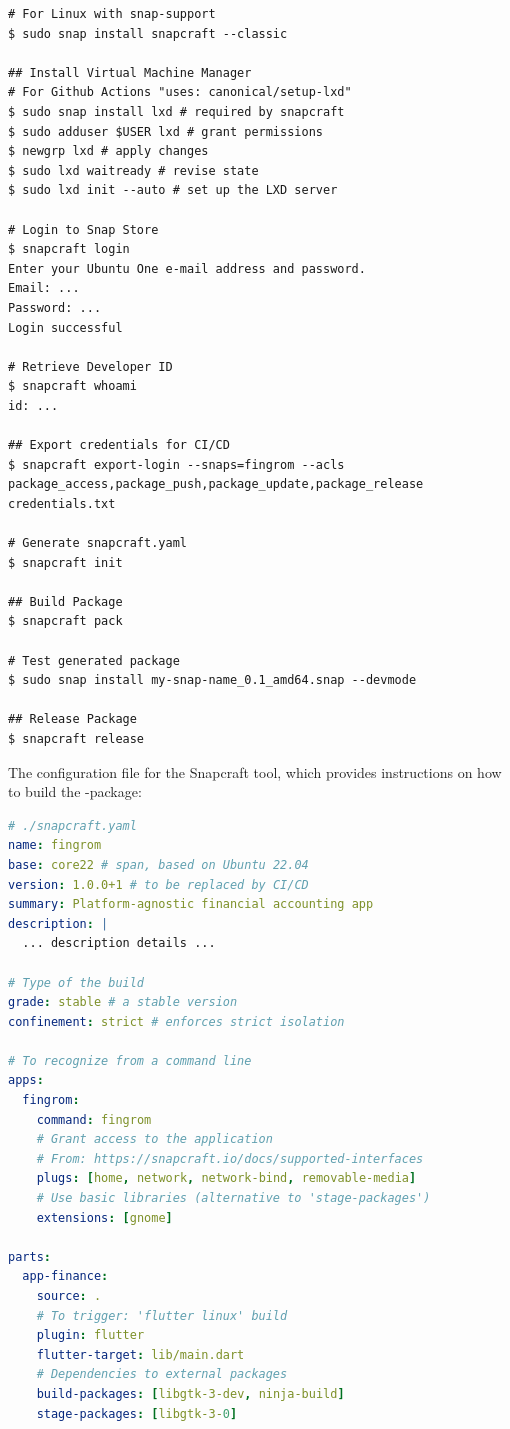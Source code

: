\begin{lstlisting}[language=terminal]
# For Linux with snap-support
$ sudo snap install snapcraft --classic

## Install Virtual Machine Manager
# For Github Actions "uses: canonical/setup-lxd"
$ sudo snap install lxd # required by snapcraft
$ sudo adduser $USER lxd # grant permissions
$ newgrp lxd # apply changes
$ sudo lxd waitready # revise state
$ sudo lxd init --auto # set up the LXD server

# Login to Snap Store
$ snapcraft login
Enter your Ubuntu One e-mail address and password.
Email: ...
Password: ...
Login successful

# Retrieve Developer ID
$ snapcraft whoami
id: ...

## Export credentials for CI/CD
$ snapcraft export-login --snaps=fingrom --acls package_access,package_push,package_update,package_release credentials.txt

# Generate snapcraft.yaml
$ snapcraft init

## Build Package
$ snapcraft pack

# Test generated package
$ sudo snap install my-snap-name_0.1_amd64.snap --devmode

## Release Package
$ snapcraft release
\end{lstlisting}

\noindent The configuration file for the Snapcraft tool, which provides instructions on how to build the -package:

\begin{lstlisting}[language=yaml]
# ./snapcraft.yaml
name: fingrom
base: core22 # span, based on Ubuntu 22.04
version: 1.0.0+1 # to be replaced by CI/CD
summary: Platform-agnostic financial accounting app
description: |
  ... description details ...

# Type of the build
grade: stable # a stable version
confinement: strict # enforces strict isolation

# To recognize from a command line
apps:
  fingrom:
    command: fingrom
    # Grant access to the application
    # From: https://snapcraft.io/docs/supported-interfaces
    plugs: [home, network, network-bind, removable-media]
    # Use basic libraries (alternative to 'stage-packages')
    extensions: [gnome]

parts:
  app-finance:
    source: .
    # To trigger: 'flutter linux' build
    plugin: flutter
    flutter-target: lib/main.dart
    # Dependencies to external packages
    build-packages: [libgtk-3-dev, ninja-build]
    stage-packages: [libgtk-3-0]
\end{lstlisting}

